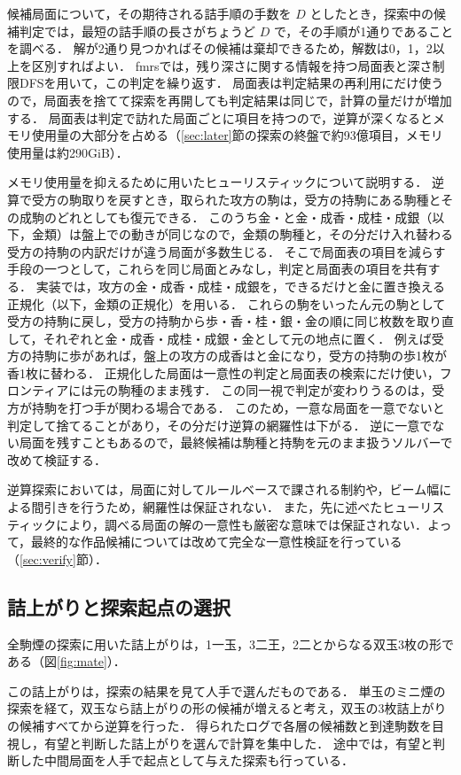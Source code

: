 \documentclass[english,submit]{ipsj}
\begin{document}
候補局面について，その期待される詰手順の手数を $D$ としたとき，探索中の候補判定では，最短の詰手順の長さがちょうど $D$ で，その手順が1通りであることを調べる．
解が2通り見つかればその候補は棄却できるため，解数は0，1，2以上を区別すればよい．
fmrsでは，残り深さに関する情報を持つ局面表と深さ制限DFSを用いて，この判定を繰り返す．
局面表は判定結果の再利用にだけ使うので，局面表を捨てて探索を再開しても判定結果は同じで，計算の量だけが増加する．
局面表は判定で訪れた局面ごとに項目を持つので，逆算が深くなるとメモリ使用量の大部分を占める（\ref{sec:later}節の探索の終盤で約93億項目，メモリ使用量は約290GiB）．

メモリ使用量を抑えるために用いたヒューリスティックについて説明する．
逆算で受方の駒取りを戻すとき，取られた攻方の駒は，受方の持駒にある駒種とその成駒のどれとしても復元できる．
このうち金・と金・成香・成桂・成銀（以下，金類）は盤上での動きが同じなので，金類の駒種と，その分だけ入れ替わる受方の持駒の内訳だけが違う局面が多数生じる．
そこで局面表の項目を減らす手段の一つとして，これらを同じ局面とみなし，判定と局面表の項目を共有する．
実装では，攻方の金・成香・成桂・成銀を，できるだけと金に置き換える正規化（以下，金類の正規化）を用いる．
これらの駒をいったん元の駒として受方の持駒に戻し，受方の持駒から歩・香・桂・銀・金の順に同じ枚数を取り直して，それぞれと金・成香・成桂・成銀・金として元の地点に置く．
例えば受方の持駒に歩があれば，盤上の攻方の成香はと金になり，受方の持駒の歩1枚が香1枚に替わる．
正規化した局面は一意性の判定と局面表の検索にだけ使い，フロンティアには元の駒種のまま残す．
この同一視で判定が変わりうるのは，受方が持駒を打つ手が関わる場合である．
このため，一意な局面を一意でないと判定して捨てることがあり，その分だけ逆算の網羅性は下がる．
逆に一意でない局面を残すこともあるので，最終候補は駒種と持駒を元のまま扱うソルバーで改めて検証する．

逆算探索においては，局面に対してルールベースで課される制約や，ビーム幅による間引きを行うため，網羅性は保証されない．
また，先に述べたヒューリスティックにより，調べる局面の解の一意性も厳密な意味では保証されない．よって，最終的な作品候補については改めて完全な一意性検証を行っている（\ref{sec:verify}節）．

\subsection{詰上がりと探索起点の選択}
\label{sec:start}
全駒煙の探索に用いた詰上がりは，1一玉，3二王，2二とからなる双玉3枚の形である（図\ref{fig:mate}）．

この詰上がりは，探索の結果を見て人手で選んだものである．
単玉のミニ煙の探索を経て，双玉なら詰上がりの形の候補が増えると考え，双玉の3枚詰上がりの候補すべてから逆算を行った．
得られたログで各層の候補数と到達駒数を目視し，有望と判断した詰上がりを選んで計算を集中した．
途中では，有望と判断した中間局面を人手で起点として与えた探索も行っている．
\end{document}
